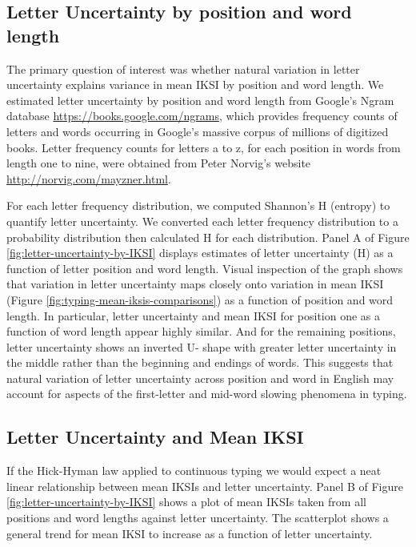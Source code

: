\documentclass[floatsintext,man]{apa6}
\theoremstyle{definition}
\theoremstyle{definition}
\theoremstyle{definition}
\theoremstyle{remark}
\begin{document}
\subsection{Letter Uncertainty by position and word
length}\label{letter-uncertainty-by-position-and-word-length}

The primary question of interest was whether natural variation in letter
uncertainty explains variance in mean IKSI by position and word length.
We estimated letter uncertainty by position and word length from
Google's Ngram database \url{https://books.google.com/ngrams}, which
provides frequency counts of letters and words occurring in Google's
massive corpus of millions of digitized books. Letter frequency counts
for letters a to z, for each position in words from length one to nine,
were obtained from Peter Norvig's website
\url{http://norvig.com/mayzner.html}.

For each letter frequency distribution, we computed Shannon's H
(entropy) to quantify letter uncertainty. We converted each letter
frequency distribution to a probability distribution then calculated H
for each distribution. Panel A of Figure
\ref{fig:letter-uncertainty-by-IKSI} displays estimates of letter
uncertainty (H) as a function of letter position and word length. Visual
inspection of the graph shows that variation in letter uncertainty maps
closely onto variation in mean IKSI (Figure
\ref{fig:typing-mean-iksis-comparisons}) as a function of position and
word length. In particular, letter uncertainty and mean IKSI for
position one as a function of word length appear highly similar. And for
the remaining positions, letter uncertainty shows an inverted U- shape
with greater letter uncertainty in the middle rather than the beginning
and endings of words. This suggests that natural variation of letter
uncertainty across position and word in English may account for aspects
of the first-letter and mid-word slowing phenomena in typing.

\subsection{Letter Uncertainty and Mean
IKSI}\label{letter-uncertainty-and-mean-iksi}

If the Hick-Hyman law applied to continuous typing we would expect a
neat linear relationship between mean IKSIs and letter uncertainty.
Panel B of Figure \ref{fig:letter-uncertainty-by-IKSI} shows a plot of
mean IKSIs taken from all positions and word lengths against letter
uncertainty. The scatterplot shows a general trend for mean IKSI to
increase as a function of letter uncertainty.
\end{document}

